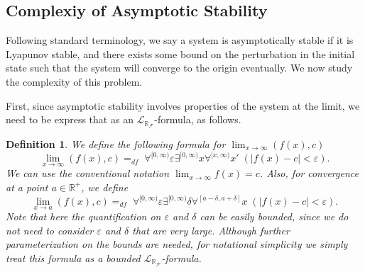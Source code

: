 \documentclass[10pt]{article}
\theoremstyle{plain}
\newtheorem{definition}[theorem]{Definition}
\theoremstyle{definition}
\newcommand{\lrf}{\mathcal{L}_{\mathbb{R}_{\mathcal{F}}}}
\begin{document}
\subsection{Complexiy of Asymptotic Stability}

Following standard terminology, we say a system is asymptotically stable if it is Lyapunov stable, and there exists some bound on the perturbation in the initial state such that the system will converge to the origin eventually. We now study the complexity of this problem. 

First, since asymptotic stability involves properties of the system at the limit, we need to be express that as an $\lrf$-formula, as follows. 
\begin{definition}
We define the following formula for $\lim_{x\rightarrow \infty}(f(x), c)$
$$\lim_{x\rightarrow \infty}(f(x), c) =_{df}\; \forall^{[0,\infty)} \varepsilon \exists^{[0,\infty)} x \forall^{[x,\infty)}x'  \; (|f(x) - c|<\varepsilon).$$
We can use the conventional notation $\lim_{x\rightarrow \infty} f(x) = c$. Also, for convergence at a point $a\in \mathbb{R}^+$, we define 
$$\lim_{x\rightarrow a}(f(x), c) =_{df}\; \forall^{[0,\infty)} \varepsilon \exists^{[0,\infty)} \delta \forall^{[a-\delta,a+\delta]}x  \; (|f(x) - c|<\varepsilon).$$
Note that here the quantification on $\varepsilon$ and $\delta$ can be easily bounded, since we do not need to consider $\varepsilon$ and $\delta$ that are very large. Although further parameterization on the bounds are needed, for notational simplicity we simply treat this formula as a bounded $\lrf$-formula. 
\end{definition}
\end{document}
